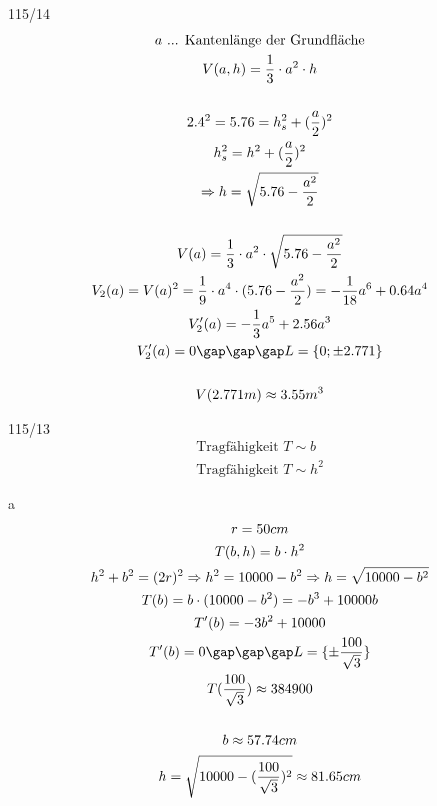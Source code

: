 \begin{exercise}{115/14}
  \begin{gather*}
    a \text{ ... Kantenlänge der Grundfläche} \\
    V(a, h) = \frac{1}{3} \cdot a^2 \cdot h \\\\
    2.4^2 = 5.76 = h_s^2 + (\frac{a}{2})^2 \\
    h_s^2 = h^2 + (\frac{a}{2})^2 \\
    \Rightarrow h = \sqrt{5.76 - \frac{a^2}{2}} \\\\
    V(a) = \frac{1}{3} \cdot a^2 \cdot \sqrt{5.76 - \frac{a^2}{2}} \\
    V_2(a) = V(a)^2 = \frac{1}{9} \cdot a^4 \cdot (5.76 - \frac{a^2}{2}) = -\frac{1}{18}a^6 + 0.64a^4 \\
    V_2'(a) = -\frac{1}{3}a^5 + 2.56a^3 \\
    V_2'(a) = 0 \gap\gap\gap L = \{0; \pm 2.771\} \\\\
    V(2.771m) \approx 3.55m^3
  \end{gather*}
\end{exercise}
\begin{exercise}{115/13}
  \begin{gather*}
    \text{Tragfähigkeit } T \sim b \\
    \text{Tragfähigkeit } T \sim h^2
  \end{gather*}
  \item [a]
  \begin{gather*}
    r = 50cm \\
    T(b, h) = b \cdot h^2 \\
    h^2 + b^2 = (2r)^2 \Rightarrow h^2 = 10000 - b^2 \Rightarrow h = \sqrt{10000 - b^2} \\
    T(b) = b \cdot (10000 - b^2) = -b^3 + 10000b \\
    T'(b) = -3b^2 + 10000 \\
    T'(b) = 0 \gap\gap\gap L = \{\pm \frac{100}{\sqrt{3}}\} \\
    T(\frac{100}{\sqrt{3}}) \approx 384900 \\\\
    b \approx 57.74cm \\
    h = \sqrt{10000 - (\frac{100}{\sqrt{3}})^2} \approx 81.65cm
  \end{gather*}
\end{exercise}

\newpage
